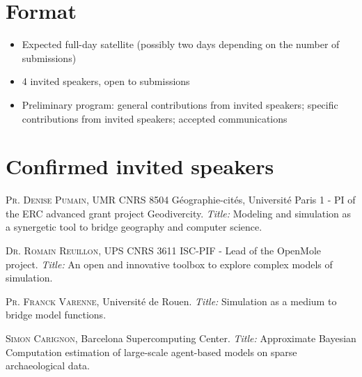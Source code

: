 \documentclass[11pt]{article}
\newcommand{\noun}[1]{\textsc{#1}}
\begin{document}
\section*{Format}

\begin{itemize}
	\item Expected full-day satellite (possibly two days depending on the number of submissions)
    \item 4 invited speakers, open to submissions
    \item Preliminary program: general contributions from invited speakers; specific contributions from invited speakers; accepted communications
\end{itemize}


\section*{Confirmed invited speakers}

\noindent\noun{Pr. Denise Pumain}, UMR CNRS 8504 G{\'e}ographie-cit{\'e}s, Universit{\'e} Paris 1 - PI of the ERC advanced grant project Geodivercity. \textit{Title: } Modeling and simulation as a synergetic tool to bridge geography and computer science.

\bigskip

\noindent\noun{Dr. Romain Reuillon}, UPS CNRS 3611 ISC-PIF - Lead of the OpenMole project. \textit{Title: } An open and innovative toolbox to explore complex models of simulation.

\bigskip

\noindent\noun{Pr. Franck Varenne}, Universit{\'e} de Rouen. \textit{Title: } Simulation as a medium to bridge model functions.

\bigskip

\noindent\noun{Simon Carignon}, Barcelona Supercomputing Center. \textit{Title: } Approximate Bayesian Computation estimation of large-scale agent-based models on sparse archaeological data.














\end{document}
